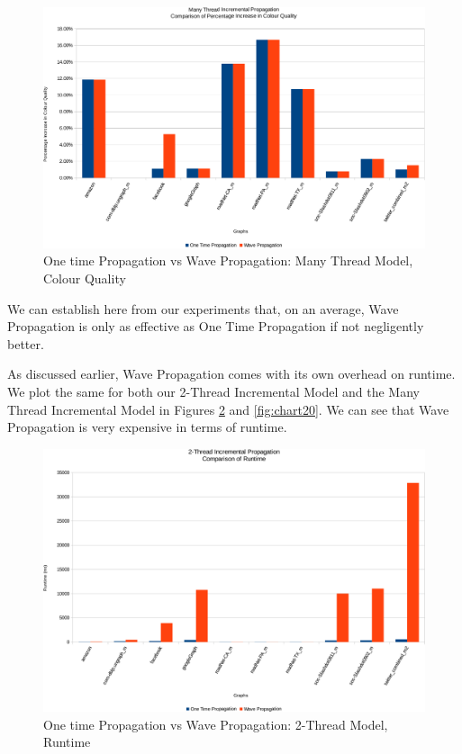 \documentclass[MTech]{iitmdiss}
\begin{document}
\begin{figure}[h]
    \centering
    \includegraphics[width=\textwidth,keepaspectratio=true]{chartNewest34.pdf}
    \caption{
        One time Propagation vs Wave Propagation: Many Thread Model, Colour Quality
    }
    \label{fig:chart18}
\end{figure}
 
We can establish here from our experiments that, on an average, Wave Propagation is only as effective as One Time Propagation if not negligently better.

As discussed earlier, Wave Propagation comes with its own overhead on runtime. We plot the same for both our 2-Thread Incremental Model and the Many Thread Incremental Model in Figures \ref{fig:chart19} and \ref{fig:chart20}. We can see that Wave Propagation is very expensive in terms of runtime.

\begin{figure}[h]
    \centering
    \includegraphics[width=\textwidth,keepaspectratio=true]{chartNewest33.pdf}
    \caption{
        One time Propagation vs Wave Propagation: 2-Thread Model, Runtime
    }
    \label{fig:chart19}
\end{figure}
\end{document}
